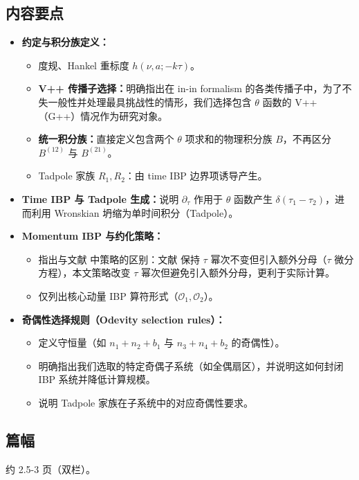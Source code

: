 \documentclass[UTF8,a4paper,11pt]{ctexart}
\begin{document}
\subsection*{内容要点}
\begin{itemize}
  \item \textbf{约定与积分族定义：}
    \begin{itemize}
        \item 度规、Hankel 重标度 $h(\nu,a;-k\tau)$。
        \item \textbf{V++ 传播子选择：}明确指出在 in-in formalism 的各类传播子中，为了不失一般性并处理最具挑战性的情形，我们选择包含 $\theta$ 函数的 V++（G++）情况作为研究对象。
        \item \textbf{统一积分族：}直接定义包含两个 $\theta$ 项求和的物理积分族 $B$，不再区分 $B^{(12)}$ 与 $B^{(21)}$。
        \item Tadpole 家族 $R_1, R_2$：由 time IBP 边界项诱导产生。
    \end{itemize}
  \item \textbf{Time IBP 与 Tadpole 生成：}说明 $\partial_\tau$ 作用于 $\theta$ 函数产生 $\delta(\tau_1-\tau_2)$，进而利用 Wronskian 坍缩为单时间积分（Tadpole）。
  \item \textbf{Momentum IBP 与约化策略：}
    \begin{itemize}
        \item 指出与文献 \cite{} 中策略的区别：文献 \cite{} 保持 $\tau$ 幂次不变但引入额外分母（$\tau$ 微分方程），本文策略改变 $\tau$ 幂次但避免引入额外分母，更利于实际计算。
        \item 仅列出核心动量 IBP 算符形式（$\mathcal{O}_1, \mathcal{O}_2$）。
    \end{itemize}
  \item \textbf{奇偶性选择规则（Odevity selection rules）：}
    \begin{itemize}
        \item 定义守恒量（如 $n_1+n_2+b_1$ 与 $n_3+n_4+b_2$ 的奇偶性）。
        \item 明确指出我们选取的特定奇偶子系统（如全偶扇区），并说明这如何封闭 IBP 系统并降低计算规模。
        \item 说明 Tadpole 家族在子系统中的对应奇偶性要求。
    \end{itemize}
\end{itemize}
\subsection*{篇幅}
约 2.5-3 页（双栏）。
\end{document}
